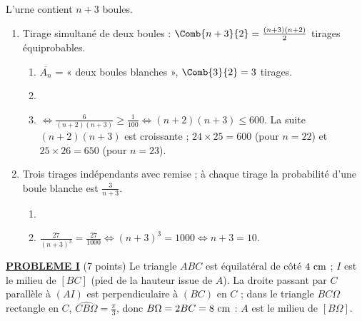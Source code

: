 \begin{description}
\begin{enumerate}
\begin{enumerate}
				\par\noindent{}
		\end{enumerate}
	\end{enumerate}
	\item[II. Probabilité :] L'urne contient $n + 3$ boules.
	\begin{enumerate}
		\item Tirage simultané de deux boules : $\Comb{n+3}{2} = \frac{(n+3)(n+2)}{2}$ tirages équiprobables.
		\begin{enumerate}
			\item {}
				$\overline{A_n}$ = « deux boules blanches », $\Comb{3}{2} = 3$ tirages.
				\par\noindent{}
			\item {}
			\item {}
				$\iff \frac{6}{(n+2)(n+3)} \geq \frac{1}{100} \iff (n+2)(n+3) \leq 600$.
				La suite $(n+2)(n+3)$ est croissante ; $24 \times 25 = 600$ (pour $n = 22$) et $25 \times 26 = 650$ (pour $n = 23$).
				\par\noindent{}
		\end{enumerate}
		\item Trois tirages indépendants avec remise ; à chaque tirage la probabilité d'une boule blanche est $\frac{3}{n+3}$.
		\begin{enumerate}
			\item {}
			\item {}
				$\frac{27}{(n+3)^3} = \frac{27}{1000} \iff (n+3)^3 = 1000 \iff n + 3 = 10$. \par\noindent{}
		\end{enumerate}
	\end{enumerate}
\end{description}
\noindent \underline{\textsc{\textbf{PROBLEME I}}} (7 points) \newline
Le triangle $ABC$ est équilatéral de côté $4~\mathrm{cm}$ ; $I$ est le milieu de $[BC]$ (pied de la hauteur issue de $A$).
La droite passant par $C$ parallèle à $(AI)$ est perpendiculaire à $(BC)$ en $C$ ; dans le triangle $B C \Omega$ rectangle en $C$, $\widehat{CB\Omega} = \frac{\pi}{3}$, donc $B\Omega = 2BC = 8~\mathrm{cm}$ : $A$ est le milieu de $[B\Omega]$.
